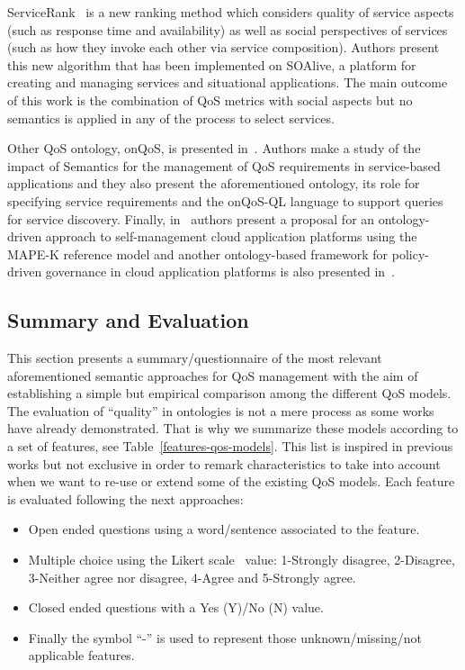 ServiceRank~\cite{Wu:2009:CQS:1696051.1696105} is a new ranking method which 
considers quality of service aspects (such as response time and availability) as 
well as social perspectives of services (such as how they invoke each other via 
service composition). Authors present this new algorithm that has been 
implemented on SOAlive, a platform for creating and managing services and 
situational applications. The main outcome of this work is the combination of 
QoS metrics with social aspects but no semantics is applied in any of the 
process to select services. 

Other QoS ontology, onQoS, is presented in~\cite{Damiano:2009:OQL:1506129.1506143}. Authors make a study of the impact of 
Semantics for the management of QoS requirements in service-based 
applications and they also present the aforementioned ontology, its role for 
specifying service requirements and the onQoS-QL language to support queries for 
service discovery. Finally, in~\cite{Dautov:2013:ASC:2462307.2462312} authors present a proposal for an 
ontology-driven approach to self-management cloud application platforms using 
the MAPE-K reference model and another ontology-based framework for policy-driven 
governance in cloud application platforms is also presented 
in~\cite{DBLP:conf/icsoc/KourtesisP11}.

\subsection{Summary and Evaluation}
This section presents a summary/questionnaire of the most relevant aforementioned semantic approaches for QoS management 
with the aim of establishing a simple but empirical comparison among the different QoS models. 
The evaluation of ``quality'' in ontologies is not a mere process as some works~\cite{DBLP:conf/dexa/dAquinSSS07,DBLP:conf/nldb/SabouFM09,Brank05asurvey} 
have already demonstrated. That is why we summarize these models according to a set of features, see Table~\ref{features-qos-models}. 
This list is inspired in previous works but not exclusive in order to remark characteristics 
to take into account when we want to re-use or extend some of the existing QoS models. 
Each feature is evaluated following the next approaches:
\begin{itemize}
 \item Open ended questions using a word/sentence associated to the feature.
 \item Multiple choice using the Likert scale~\cite{albaum1997likert} value: 1-Strongly disagree, 2-Disagree, 3-Neither agree nor disagree, 4-Agree and 5-Strongly agree.
 \item Closed ended questions with a Yes (Y)/No (N) value. 
 \item Finally the symbol ``-'' is used to represent those unknown/missing/not applicable features.
\end{itemize}

